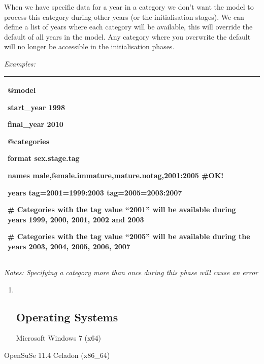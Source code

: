 \documentclass[a4paper,11pt,twoside,pdftex,draft]{article}
\begin{document}
When we have specific data for a year in a category we don't want the
model to process this category during other years (or the initialisation
stages). We can define a list of years where each category will be
available, this will override the default of all years in the model. Any
category where you overwrite the default will no longer be accessible in
the initialisation phases.

\emph{Examples:}

\begin{longtable}[]{@{}l@{}}
\toprule
\endhead
\begin{minipage}[t]{0.97\columnwidth}\raggedright
@model

start\_year 1998

final\_year 2010

@categories

format sex.stage.tag

names male,female.immature,mature.notag,2001:2005 \#OK!

years tag=2001=1999:2003 tag=2005=2003:2007

\# Categories with the tag value ``2001'' will be available during years
1999, 2000, 2001, 2002 and 2003

\# Categories with the tag value ``2005'' will be available during the
years 2003, 2004, 2005, 2006, 2007\strut
\end{minipage}\tabularnewline
\bottomrule
\end{longtable}

\emph{Notes: Specifying a category more than once during this phase will
cause an error}

\begin{enumerate}
\item ~
  \hypertarget{operating-systems}{%
  \subsection{Operating Systems}\label{operating-systems}}

  Microsoft Windows 7 (x64)
\end{enumerate}

OpenSuSe 11.4 Celadon (x86\_64)
\end{document}
